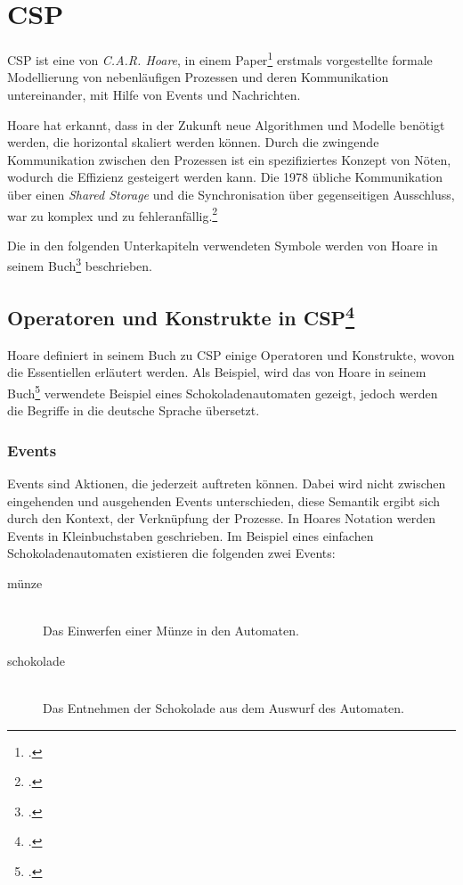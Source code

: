 \section{\acl{CSP}}
\acf{CSP} ist eine von \textit{C.A.R. Hoare}, in einem Paper\footcite{CSP} erstmals vorgestellte formale Modellierung von nebenläufigen Prozessen und deren Kommunikation untereinander, mit Hilfe von Events und Nachrichten.

Hoare hat erkannt, dass in der Zukunft neue Algorithmen und Modelle benötigt werden, die horizontal skaliert werden können. Durch die zwingende Kommunikation zwischen den Prozessen ist ein spezifiziertes Konzept von Nöten, wodurch die Effizienz gesteigert werden kann. Die 1978 übliche Kommunikation über einen \textit{Shared Storage} und die Synchronisation über gegenseitigen Ausschluss, war zu komplex und zu fehleranfällig.\footcite[Introduction]{CSP}

Die in den folgenden Unterkapiteln verwendeten Symbole werden von Hoare in seinem Buch\footcite[Glossary of Symbols]{CSPBOOK} beschrieben.

\subsection[Operatoren und Konstrukte in \acs{CSP}]{Operatoren und Konstrukte in \acs{CSP}\footcite[Siehe][Kap. 1.1]{CSPBOOK}}

Hoare definiert in seinem Buch zu \ac{CSP} einige Operatoren und Konstrukte, wovon die Essentiellen erläutert werden. Als Beispiel, wird das von Hoare in seinem Buch\footcite{CSPBOOK} verwendete Beispiel eines Schokoladenautomaten gezeigt, jedoch werden die Begriffe in die deutsche Sprache übersetzt.

\subsubsection{Events}
Events sind Aktionen, die jederzeit auftreten können. Dabei wird nicht zwischen eingehenden und ausgehenden Events unterschieden, diese Semantik ergibt sich durch den Kontext, der Verknüpfung der Prozesse. In Hoares Notation werden Events in Kleinbuchstaben geschrieben.
Im Beispiel eines einfachen Schokoladenautomaten existieren die folgenden zwei Events:

\begin{description}
\item[münze]\hfill \\
Das Einwerfen einer Münze in den Automaten.
\item[schokolade]\hfill \\
Das Entnehmen der Schokolade aus dem Auswurf des Automaten.
\end{description}

